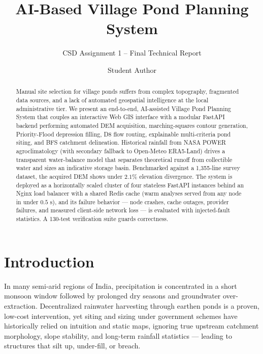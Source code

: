 \documentclass[manuscript,screen,review]{acmart}
\begin{document}
\title{AI-Based Village Pond Planning System}
\subtitle{CSD Assignment 1 -- Final Technical Report}

\author{Student Author}

\renewcommand{\shortauthors}{Author et al.}

\begin{abstract}
Manual site selection for village ponds suffers from complex topography, fragmented data sources, and a lack of automated geospatial intelligence at the local administrative tier. We present an end-to-end, AI-assisted Village Pond Planning System that couples an interactive Web GIS interface with a modular FastAPI backend performing automated DEM acquisition, marching-squares contour generation, Priority-Flood depression filling, D8 flow routing, explainable multi-criteria pond siting, and BFS catchment delineation. Historical rainfall from NASA POWER agroclimatology (with secondary fallback to Open-Meteo ERA5-Land) drives a transparent water-balance model that separates theoretical runoff from collectible water and sizes an indicative storage basin. Benchmarked against a 1,355-line survey dataset, the acquired DEM shows under $2.1\%$ elevation divergence. The system is deployed as a horizontally scaled cluster of four stateless FastAPI instances behind an Nginx load balancer with a shared Redis cache (warm analyses served from any node in under $0.5\text{ s}$), and its failure behavior --- node crashes, cache outages, provider failures, and measured client-side network loss --- is evaluated with injected-fault statistics. A 130-test verification suite guards correctness.
\end{abstract}


\maketitle

\section{Introduction}
\label{sec:intro}
In many semi-arid regions of India, precipitation is concentrated in a short monsoon window followed by prolonged dry seasons and groundwater over-extraction. Decentralized rainwater harvesting through earthen ponds is a proven, low-cost intervention, yet siting and sizing under government schemes have historically relied on intuition and static maps, ignoring true upstream catchment morphology, slope stability, and long-term rainfall statistics --- leading to structures that silt up, under-fill, or breach.
\end{document}
